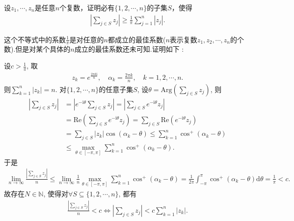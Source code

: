 \documentclass[../../main.tex]{subfiles}%
\begin{document}
\begin{lemma}
设$z_1,\cdots,z_n$是任意$n$个复数，证明必有$\{1,2,\cdots,n\}$的子集$S$，使得
\begin{align*}
\left| \sum_{j\in S} z_j \right| \geqslant \frac{1}{\pi} \sum_{j=1}^{n} |z_j|.
\end{align*}
\end{lemma}
\begin{remark}
这个不等式中的系数$\frac{1}{\pi}$是对任意的$n$都成立的最佳系数($n$表示复数$z_1,z_2,\cdots,z_n$的个数).但是对某个具体的$n$成立的最佳系数还未可知.证明如下 :

设$c>\frac{1}{\pi}$, 取
\begin{align*}
z_k=e^{\frac{2\pi k\mathrm{i}}{n}},\quad \alpha _k=\frac{2\pi k}{n},\quad k=1,2,\cdots ,n.
\end{align*}
则$\sum\limits_{k=1}^n{\left| z_k \right|}=n$. 对$\{ 1,2,\cdots ,n \}$的任意子集$S$, 设$\theta =\mathrm{Arg}\left( \sum\limits_{j\in S}{z_j} \right)$, 则
\begin{align*}
\left| \sum\limits_{j\in S}{z_j} \right|&=\left| e^{-\mathrm{i}\theta}\sum\limits_{j\in S}{z_j} \right|=\left| \sum\limits_{j\in S}{e^{-\mathrm{i}\theta}z_j} \right| \\
&=\mathrm{Re}\left( \sum\limits_{j\in S}{e^{-\mathrm{i}\theta}z_j} \right) =\sum\limits_{j\in S}{\mathrm{Re}\left( e^{-\mathrm{i}\theta}z_j \right)} \\
&=\sum\limits_{j\in S}{\left| z_k \right|\cos \left( \alpha _k-\theta \right)}\leqslant \sum\limits_{k=1}^n{\cos ^+\left( \alpha _k-\theta \right)} \\
&\leqslant \max\limits_{\theta \in \left[ -\pi ,\pi \right]}\sum\limits_{k=1}^n{\cos ^+\left( \alpha _k-\theta \right)}.
\end{align*}
于是
\begin{align*}
\lim\limits_{n\rightarrow \infty}\frac{\left| \sum\limits_{j\in S}{z_j} \right|}{n}\leqslant \lim\limits_{n\rightarrow \infty}\frac{1}{n}\max\limits_{\theta \in \left[ -\pi ,\pi \right]}\sum\limits_{k=1}^n{\cos ^+\left( \alpha _k-\theta \right)}=\frac{1}{2\pi}\int_{-\pi}^{\pi}{\cos ^+\left( \alpha _k-\theta \right) \mathrm{d}\theta}=\frac{1}{\pi}<c.
\end{align*}
故存在$N\in \mathbb{N}$, 使得对$\forall S\subseteq \{ 1,2,\cdots ,n \}$, 都有
\begin{align*}
\frac{\left| \sum\limits_{j\in S}{z_j} \right|}{n}<c\Longleftrightarrow \left| \sum\limits_{j\in S}{z_j} \right|<c\sum\limits_{k=1}^n{\left| z_k \right|}.
\end{align*}
\end{remark}
\end{document}
